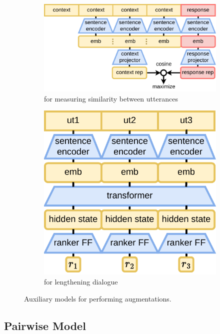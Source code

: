 \documentclass{article}
\begin{document}
\begin{figure}[!htb]
    \centering
    \begin{subfigure}[t]{0.6\linewidth}
        \centering
        \includegraphics[width=0.9\linewidth]{figures/pairwise.drawio.pdf}
        \caption{for measuring similarity between utterances}
        \label{fig:pairwise}
    \end{subfigure}
    \begin{subfigure}[t]{0.35\linewidth}
        \centering
        \includegraphics[width=0.9\linewidth]{figures/listwise.drawio.pdf}
        \caption{for lengthening dialogue}
        \label{fig:listwise}
    \end{subfigure}
    \caption{Auxiliary models for performing augmentations.}
    \label{fig:enter-label}
\end{figure}

\subsection{Pairwise Model}
\end{document}
